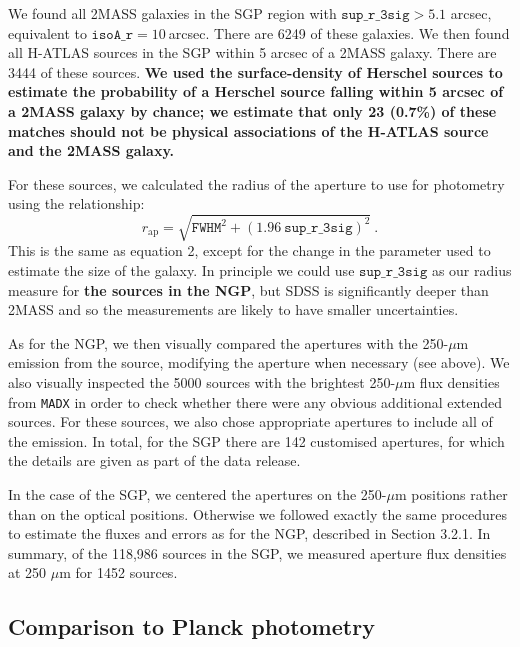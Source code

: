 \documentclass[a4paper,fleqn,usenatbib, twocolumn]{aastex61}
\begin{document}
We found all 2MASS galaxies in the SGP region with
$\mathtt{sup\_r\_3sig}>5.1$ arcsec, equivalent to
$\mathtt{isoA\_r}=10\ $arcsec. There are 6249 of these galaxies. We
then found all H-ATLAS sources in the SGP within 5 arcsec of a 2MASS
galaxy. There are 3444 of these sources. {\bf We used the surface-density
of Herschel sources to estimate the probability of a Herschel source
falling within 5 arcsec of a 2MASS galaxy by chance; we estimate
that 
only 23 (0.7\%) of these matches should not be
physical associations of the H-ATLAS source and the 2MASS galaxy.}

For these sources, we calculated the radius of the aperture
to use for photometry using the relationship:
\smallskip
\begin{equation} 
r_\mathrm{ap} = \sqrt{ \mathtt{FWHM}^2 + {(1.96
    \ \mathtt{sup\_r\_3sig})}^2}\ .
\end{equation}
This is the same as equation 2, except for the change
in the parameter used to estimate the size of the galaxy.
In principle we could use $\mathtt{sup\_r\_3sig}$ as our radius
measure for {\bf the sources in the NGP}, but SDSS is significantly deeper than 2MASS
and so the measurements are likely to have smaller uncertainties. 

As for the NGP, we then visually compared the apertures with the
250-$\mu$m emission from the source, modifying the aperture when
necessary (see above).  We also visually inspected the 5000 sources
with the brightest 250-$\mu$m flux densities from {\tt MADX} in order to
check whether there were any obvious additional extended sources.  For
these sources, we also chose appropriate apertures to include all of
the emission.  In total, for the SGP there are 142 customised
apertures, for which the details are given as part of the data
release.

In the case of the SGP, we centered the apertures on the 250-$\mu$m
positions rather than on the optical positions. Otherwise we followed
exactly the same procedures to estimate the fluxes and errors as for
the NGP, described in Section 3.2.1.  In summary, of the 118,986
sources in the SGP, we measured aperture flux densities at 250 $\mu$m
for 1452 sources.

\subsection{ Comparison to Planck photometry}
\end{document}
